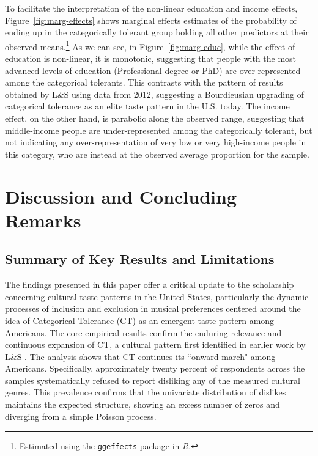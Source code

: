 \documentclass[12pt]{article}
\begin{document}
To facilitate the interpretation of the non-linear education and income effects, Figure~\ref{fig:marg-effects} shows marginal effects estimates of the probability of ending up in the categorically tolerant group holding all other predictors at their observed means.\footnote{Estimated using the \texttt{ggeffects} package in \textit{R}.} As we can see, in Figure~\ref{fig:marg-educ}, while the effect of education is non-linear, it is monotonic, suggesting that people with the most advanced levels of education (Professional degree or PhD) are over-represented among the categorical tolerants. This contrasts with the pattern of results obtained by L\&S using data from 2012, suggesting a Bourdieusian upgrading of categorical tolerance as an elite taste pattern in the U.S. today. The income effect, on the other hand, is parabolic along the observed range, suggesting that middle-income people are under-represented among the categorically tolerant, but not indicating any over-representation of very low or very high-income people in this category, who are instead at the observed average proportion for the sample. 

\section*{Discussion and Concluding Remarks}

\subsection*{Summary of Key Results and Limitations}

The findings presented in this paper offer a critical update to the scholarship concerning cultural taste patterns in the United States, particularly the dynamic processes of inclusion and exclusion in musical preferences centered around the idea of Categorical Tolerance (CT) as an emergent taste pattern among Americans. The core empirical results confirm the enduring relevance and continuous expansion of CT, a cultural pattern first identified in earlier work by L\&S \citeyearpar{lizardo2016end-4fb}. The analysis shows that CT continues its ``onward march" among Americans. Specifically, approximately twenty percent of respondents across the samples systematically refused to report disliking any of the measured cultural genres. This prevalence confirms that the univariate distribution of dislikes maintains the expected structure, showing an excess number of zeros and diverging from a simple Poisson process.
\end{document}

